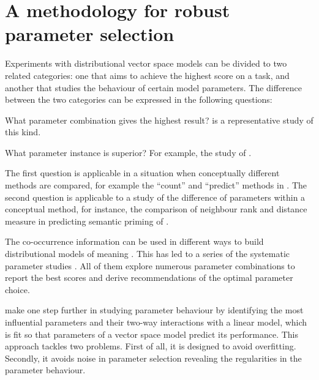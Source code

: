 \chapter{A methodology for robust parameter selection}
\label{sec:methodology}

Experiments with distributional vector space models can be divided to two related categories: one that aims to achieve the highest score on a task, and another that studies the behaviour of certain model parameters. The difference between the two categories can be expressed in the following questions:

\begin{compactitem}
\item What parameter combination gives the highest result?  is a representative study of this kind.
\item What parameter instance is superior? For example, the study of .
\end{compactitem}

The first question is applicable in a situation when conceptually different methods are compared, for example the ``count'' and  ``predict'' methods in . The second question is applicable to a study of the difference of parameters within a conceptual method, for instance, the comparison of neighbour rank and distance measure in predicting semantic priming of .

The co-occurrence information can be used in different ways to build distributional models of meaning \cite{Turney:2010:FMV:1861751.1861756}. This has led to a series of the systematic parameter studies \cite{Bullinaria2007,BullinariaLevy2012,kiela-clark:2014:CVSC,lapesa2014large,TACL570}. All of them explore numerous parameter combinations to report the best scores and derive recommendations of the optimal parameter choice.

 make one step further in studying parameter behaviour by identifying the most influential parameters and their two-way interactions with a linear model, which is fit so that parameters of a vector space model predict its performance. This approach tackles two problems. First of all, it is designed to avoid overfitting. Secondly, it avoids noise in parameter selection revealing the regularities in the parameter behaviour.

